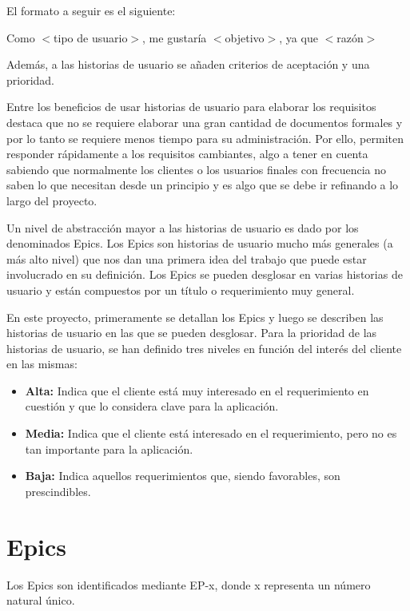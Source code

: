 El formato a seguir es el siguiente:

\begin{center}
Como $<$tipo de usuario$>$, me gustaría $<$objetivo$>$, ya que $<$razón$>$
\end{center}

Además, a las historias de usuario se añaden criterios de aceptación y una prioridad.

Entre los beneficios de usar historias de usuario para elaborar los requisitos destaca que no se requiere elaborar una gran cantidad de documentos formales y por lo tanto se requiere menos tiempo para su administración. Por ello, permiten responder rápidamente a los requisitos cambiantes, algo a tener en cuenta sabiendo que normalmente los clientes o los usuarios finales con frecuencia no saben lo que necesitan desde un principio y es algo que se debe ir refinando a lo largo del proyecto.

Un nivel de abstracción mayor a las historias de usuario es dado por los denominados Epics. Los Epics son historias de usuario mucho más generales (a más alto nivel) que nos dan una primera idea del trabajo que puede estar involucrado en su definición. Los Epics se pueden desglosar en varias historias de usuario y están compuestos por un título o requerimiento muy general.

En este proyecto, primeramente se detallan los Epics y luego se describen las historias de usuario en las que se pueden desglosar. Para la prioridad de las historias de usuario, se han definido tres niveles en función del interés del cliente en las mismas:

\begin{itemize}
\item \textbf{Alta:} Indica que el cliente está muy interesado en el requerimiento en cuestión y que lo considera clave para la aplicación.
\item \textbf{Media:} Indica que el cliente está interesado en el requerimiento, pero no es tan importante para la aplicación. 
\item \textbf{Baja:} Indica aquellos requerimientos que, siendo favorables, son prescindibles.
\end{itemize}


\section{Epics} \label{epics}
Los Epics son identificados mediante EP-x, donde x representa un número natural único.

